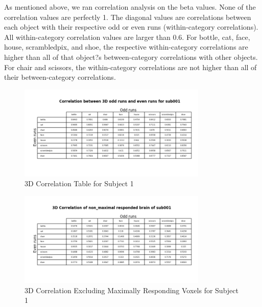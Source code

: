\documentclass[11pt,twocolumn]{article}
\begin{document}
As mentioned above, we ran correlation analysis on the beta values.
None of the correlation values are perfectly 1. The diagonal values 
are correlations between each object with their respective odd or 
even runs (within-category correlations). All within-category correlation 
values are larger than 0.6. For bottle, cat, face, house, scrambledpix, 
and shoe, the respective within-category correlations are higher than 
all of that object?s between-category correlations with other objects. 
For chair and scissors, the within-category correlations are not higher 
than all of their between-category correlations.
\begin{figure}[h!]
\centering
\includegraphics[width=90mm]{3d_correlation_table_sub001.png}
\caption{3D Correlation Table for Subject 1}
\end{figure}

\begin{figure}[h!]                                                              
\centering                                                                      
\includegraphics[width=90mm]{3d_non_max_correlation_table_sub001.png}                   
\caption{3D Correlation Excluding Maximally Responding Voxels for Subject 1}                                    
\end{figure}
\end{document}
